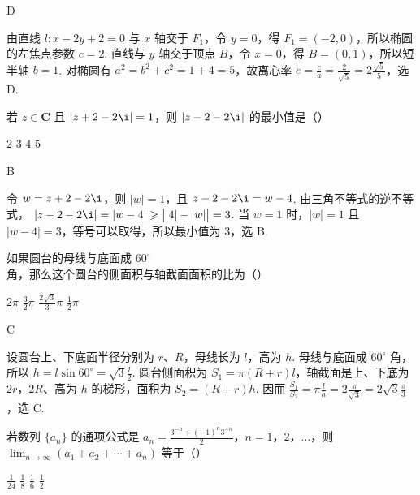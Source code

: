 \begin{answer}
D
\end{answer}

\begin{solution}
由直线 \(l:x-2y+2=0\) 与 \(x\) 轴交于 \(F_1\)，令 \(y=0\)，得 \(F_1=(-2,0)\)，所以椭圆的左焦点参数 \(c=2\). 直线与 \(y\) 轴交于顶点 \(B\)，令 \(x=0\)，得 \(B=(0,1)\)，所以短半轴 \(b=1\). 对椭圆有 \(a^2=b^2+c^2=1+4=5\)，故离心率 \(e=\frac{c}{a}=\frac{2}{\sqrt5}=2\frac{\sqrt5}{5}\)，选 D.
\end{solution}

\begin{problem}
若 \(z \in \mathbf{C}\) 且 \(\left|z + 2 - 2\i\right| = 1\)，则 \(\left|z - 2 - 2\i\right|\) 的最小值是（\quad）

\choices
    {\(2\)}
    {\(3\)}
    {\(4\)}
    {\(5\)}
\end{problem}

\begin{answer}
B
\end{answer}

\begin{solution}
令 \(w=z+2-2\i\)，则 \(\lvert w\rvert=1\)，且
\(z-2-2\i=w-4\). 由三角不等式的逆不等式，
\(\lvert z-2-2\i\rvert=\lvert w-4\rvert\geqslant\bigl|\lvert4\rvert-\lvert w\rvert\bigr|=3\). 当 \(w=1\) 时，\(\lvert w\rvert=1\) 且 \(\lvert w-4\rvert=3\)，等号可以取得，所以最小值为 \(3\)，选 B.
\end{solution}

\begin{problem}
如果圆台的母线与底面成 \(60^{\circ}\) 角，那么这个圆台的侧面积与轴截面面积的比为（\quad）

\choices
    {\(2\pi\)}
    {\(\frac{3}{2}\pi\)}
    {\(\frac{2\sqrt{3}}{3}\pi\)}
    {\(\frac{1}{2}\pi\)}
\end{problem}

\begin{answer}
C
\end{answer}

\begin{solution}
设圆台上、下底面半径分别为 \(r\)、\(R\)，母线长为 \(l\)，高为 \(h\). 母线与底面成 \(60^\circ\) 角，所以 \(h=l\sin60^\circ=\sqrt3\frac{l}{2}\). 圆台侧面积为 \(S_1=\pi(R+r)l\)，轴截面是上、下底为 \(2r\)，\(2R\)、高为 \(h\) 的梯形，面积为 \(S_2=(R+r)h\). 因而 \(\frac{S_1}{S_2}=\pi \frac{l}{h}=2\frac{\pi}{\sqrt3}=2\sqrt3\frac{\pi}{3}\)，选 C.
\end{solution}

\begin{problem}
若数列 \(\{a_n\}\) 的通项公式是 \(a_n = \frac{3^{-n} + (-1)^n 3^{-n}}{2}\)，\(n = 1\)，\(2\)，\(\ldots\)，则 \(\displaystyle\lim_{n \to \infty}(a_1 + a_2 + \cdots + a_n)\) 等于（\quad）

\choices
    {\(\frac{1}{24}\)}
    {\(\frac{1}{8}\)}
    {\(\frac{1}{6}\)}
    {\(\frac{1}{2}\)}
\end{problem}

